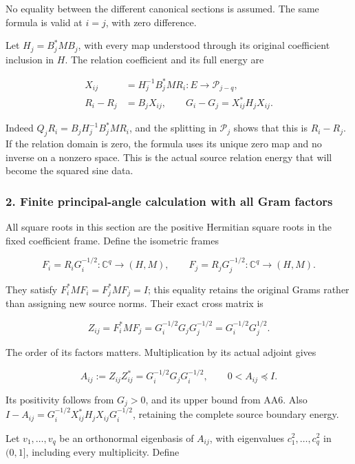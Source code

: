 No equality between the different canonical sections is assumed. The same formula is valid at \(i=j\), with zero difference.

Let \(H_j=B_j^*M B_j\), with every map understood through its original coefficient inclusion in \(H\). The relation coefficient and its full energy are

\[
\begin{aligned}
X_{ij}&=H_j^{-1}B_j^*M R_i:E\to\mathcal P_{j-q},\\
R_i-R_j&=B_jX_{ij},\qquad
G_i-G_j=X_{ij}^*H_jX_{ij}.
\end{aligned}
\tag{AA7}
\]

Indeed \(Q_jR_i=B_jH_j^{-1}B_j^*MR_i\), and the splitting in \(\mathcal P_j\) shows that this is \(R_i-R_j\). If the relation domain is zero, the formula uses its unique zero map and no inverse on a nonzero space. This is the actual source relation energy that will become the squared sine data.

\subsubsection{2. Finite principal-angle calculation with all Gram factors}\label{endpoint-all_degree_angle_review--finite-principal-angle-calculation-with-all-gram-factors}

All square roots in this section are the positive Hermitian square roots in the fixed coefficient frame. Define the isometric frames

\[
F_i=R_iG_i^{-1/2}:\mathbb C^q\to(H,M),\qquad
F_j=R_jG_j^{-1/2}:\mathbb C^q\to(H,M).
\tag{AA8}
\]

They satisfy \(F_i^*MF_i=F_j^*MF_j=I\); this equality retains the original Grams rather than assigning new source norms. Their exact cross matrix is

\[
Z_{ij}=F_i^*MF_j
=G_i^{-1/2}G_jG_j^{-1/2}
=G_i^{-1/2}G_j^{1/2}.
\tag{AA9}
\]

The order of its factors matters. Multiplication by its actual adjoint gives

\[
A_{ij}:=Z_{ij}Z_{ij}^*
=G_i^{-1/2}G_jG_i^{-1/2},
\qquad 0<A_{ij}\preceq I.
\tag{AA10}
\]

Its positivity follows from \(G_j>0\), and its upper bound from AA6. Also \(I-A_{ij}=G_i^{-1/2}X_{ij}^*H_jX_{ij}G_i^{-1/2}\), retaining the complete source boundary energy.

Let \(v_1,\ldots,v_q\) be an orthonormal eigenbasis of \(A_{ij}\), with eigenvalues \(c_1^2,\ldots,c_q^2\) in \((0,1]\), including every multiplicity. Define

